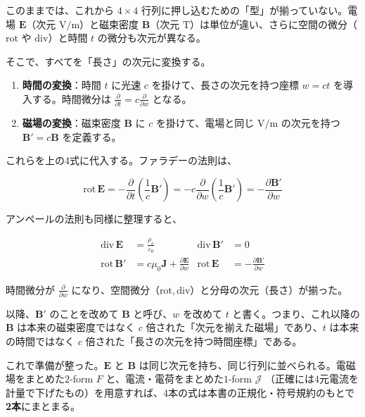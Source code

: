 \documentclass[a4paper,12pt,openany]{book}
\begin{document}
このままでは、これから \(4\times4\)
行列に押し込むための「型」が揃っていない。電場 \(\mathbf{E}\)（次元
\(\mathrm{V/m}\)）と磁束密度 \(\mathbf{B}\)（次元
\(\mathrm{T}\)）は単位が違い、さらに空間の微分（\(\mathrm{rot}\) や
\(\mathrm{div}\)）と時間 \(t\) の微分も次元が異なる。

そこで、すべてを「長さ」の次元に変換する。

\begin{enumerate}
\def\labelenumi{\arabic{enumi}.}
\item
  \textbf{時間の変換}：時間 \(t\) に光速 \(c\)
  を掛けて、長さの次元を持つ座標 \(w = ct\) を導入する。時間微分は
  \(\frac{\partial}{\partial t} = c\frac{\partial}{\partial w}\)
  となる。
\item
  \textbf{磁場の変換}：磁束密度 \(\mathbf{B}\) に \(c\)
  を掛けて、電場と同じ \(\mathrm{V/m}\) の次元を持つ
  \(\mathbf{B}' = c\mathbf{B}\) を定義する。
\end{enumerate}

これらを上の4式に代入する。ファラデーの法則は、

\[\mathrm{rot}\,\mathbf{E} = -\frac{\partial}{\partial t}\!\left(\frac{1}{c}\mathbf{B}'\right) = -c\frac{\partial}{\partial w}\!\left(\frac{1}{c}\mathbf{B}'\right) = -\frac{\partial \mathbf{B}'}{\partial w}\]

アンペールの法則も同様に整理すると、

\[\begin{aligned}
\mathrm{div}\,\mathbf{E} &= \frac{\rho_{\mathrm e}}{\varepsilon_0} &
\mathrm{div}\,\mathbf{B}' &= 0 \\[0.5em]
\mathrm{rot}\,\mathbf{B}' &= c\mu_0\mathbf{J} + \frac{\partial \mathbf{E}}{\partial w} &
\mathrm{rot}\,\mathbf{E} &= -\frac{\partial \mathbf{B}'}{\partial w}
\end{aligned}\]

時間微分が \(\frac{\partial}{\partial w}\)
になり、空間微分（\(\mathrm{rot}, \mathrm{div}\)）と分母の次元（長さ）が揃った。

以降、\(\mathbf{B}'\) のことを改めて \(\mathbf{B}\) と呼び、\(w\)
を改めて \(t\) と書く。つまり、これ以降の \(\mathbf{B}\)
は本来の磁束密度ではなく \(c\) 倍された「次元を揃えた磁場」であり、\(t\)
は本来の時間ではなく \(c\) 倍された「長さの次元を持つ時間座標」である。

これで準備が整った。\(\mathbf{E}\) と \(\mathbf{B}\)
は同じ次元を持ち、同じ行列に並べられる。電磁場をまとめた\(2\)-form \(F\)
と、電流・電荷をまとめた\(1\)-form \(\mathcal{J}\)
（正確には4元電流を計量で下げたもの）を用意すれば、4本の式は本書の正規化・符号規約のもとで\textbf{2本}にまとまる。
\end{document}
